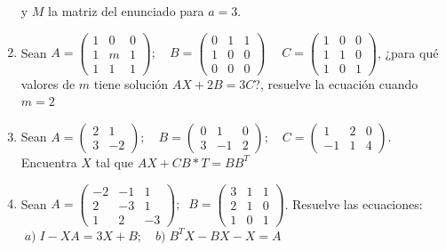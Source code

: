 \begin{enumerate}
 y $M$ la matriz del enunciado para $a=3$.


\item Sean $A=\left( \begin{matrix} 1&0&0\\1&m&1\\1&1&1 \end{matrix} \right); \quad 
B=\left( \begin{matrix} 0&1&1\\1&0&0\\0&0&0 \end{matrix} \right)\; \quad
C=\left( \begin{matrix} 1&0&0\\1&1&0\\1&0&1 \end{matrix} \right)$, ¿para qué valores de $m$ tiene solución $AX+2B=3C$?, resuelve la ecuación cuando $m=2$


\item Sean $A=\left( \begin{matrix} 2&1\\3&-2 \end{matrix} \right);\quad
B=\left( \begin{matrix} 0&1&0\\3&-1&2 \end{matrix} \right);\quad
C=\left( \begin{matrix} 1&2&0\\-1&1&4  \end{matrix} \right)$. Encuentra $X$ tal que $AX+CB*T=BB^T$


\item Sean $A=\left( \begin{matrix} -2&-1&1\\2&-3&1\\1&2&-3 \end{matrix} \right); \; \; B=\left( \begin{matrix} 3&1&1\\2&1&0\\1&0&1 \end{matrix} \right)$. Resuelve las ecuaciones:
$\; a)\;  I-XA=3X+B; \quad b) \; B^TX-BX-X=A$


\end{enumerate}

